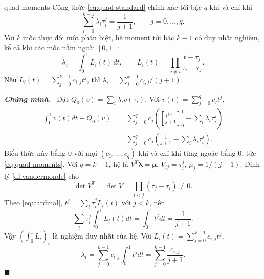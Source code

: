 \documentclass[12pt,a4paper,oneside]{book}
\numberwithin{algorithm}{chapter}
\theoremstyle{definition}
\newenvironment{chungminh}{\par\medskip\noindent\textbf{\textit{\color{mainblue}Chứng minh.}}\ }{\hfill$\blacksquare$\par\medskip}
\begin{document}
\begin{menhde}{}{quad-moments}
Công thức \eqref{eq:quad-standard} chính xác tới bậc $q$ khi và chỉ khi
\begin{equation}\label{eq:quad-moments}
 \sum_{i=0}^{k-1}\lambda_i\tau_i^j=\frac1{j+1},\qquad j=0,\ldots,q.
\end{equation}
Với $k$ mốc thực đôi một phân biệt, hệ moment tới bậc $k-1$ có duy nhất nghiệm, kể cả khi các mốc nằm ngoài $[0,1]$:
\[
 \lambda_i=\int_0^1 L_i(t)\,dt,\qquad
 L_i(t)=\prod_{j\ne i}\frac{t-\tau_j}{\tau_i-\tau_j}.
\]
Nếu $L_i(t)=\sum_{j=0}^{k-1}c_{i,j}t^j$, thì $\lambda_i=\sum_{j=0}^{k-1}c_{i,j}/(j+1)$.
\end{menhde}
\begin{chungminh}
Đặt $Q_0(v)=\sum_i\lambda_iv(\tau_i)$. Với $v(t)=\sum_{j=0}^qc_jt^j$,
\begin{align*}
 \int_0^1v(t)dt-Q_0(v)
 &=\sum_{j=0}^qc_j\left(\left[\frac{t^{j+1}}{j+1}\right]_0^1-\sum_i\lambda_i\tau_i^j\right)\\
 &=\sum_{j=0}^qc_j\left(\frac1{j+1}-\sum_i\lambda_i\tau_i^j\right).
\end{align*}
Biểu thức này bằng $0$ với mọi $(c_0,\ldots,c_q)$ khi và chỉ khi từng ngoặc bằng $0$, tức \eqref{eq:quad-moments}. Với $q=k-1$, hệ là $V^T\boldsymbol\lambda=\boldsymbol\mu$, $V_{ij}=\tau_i^j$, $\mu_j=1/(j+1)$. Định lý \ref{dl:vandermonde} cho
\[
 \det V^T=\det V=\prod_{i<j}(\tau_j-\tau_i)\ne0.
\]
Theo \eqref{eq:cardinal}, $t^j=\sum_i\tau_i^jL_i(t)$ với $j<k$, nên
\[
 \sum_i\tau_i^j\int_0^1L_i(t)dt=\int_0^1t^jdt=\frac1{j+1}.
\]
Vậy $(\int_0^1L_i)_i$ là nghiệm duy nhất của hệ. Với $L_i(t)=\sum_{j=0}^{k-1}c_{i,j}t^j$,
\[
 \lambda_i=\sum_{j=0}^{k-1}c_{i,j}\int_0^1t^jdt=\sum_{j=0}^{k-1}\frac{c_{i,j}}{j+1}.
\]
\end{chungminh}
\end{document}
